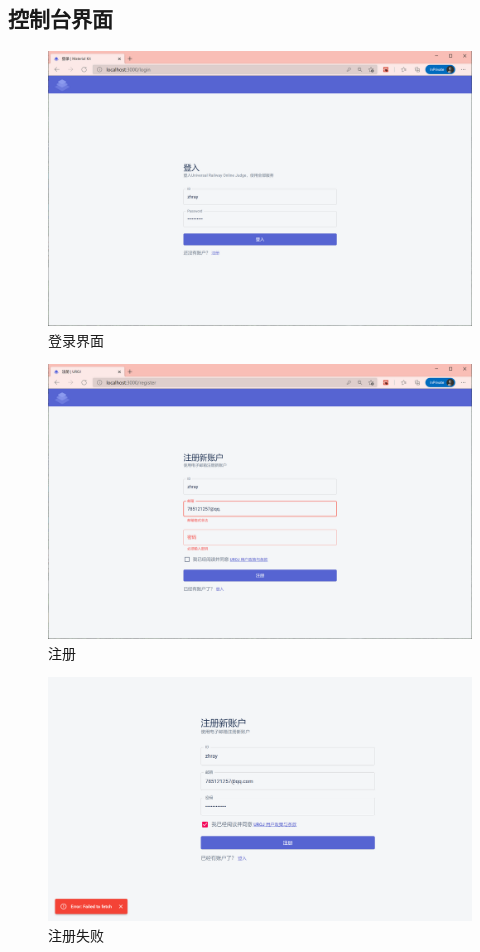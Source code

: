 \subsection{控制台界面}
\begin{figure}[htbp!]
    \centering
    \includegraphics[width=\textwidth]{figures/png/login.png}
    \caption{\label{login}登录界面}
\end{figure}

\begin{figure}[htbp!]
    \centering
    \includegraphics[width=\textwidth]{figures/png/input_err.png}
    \caption{\label{input_err}注册}
\end{figure}

\begin{figure}[htbp!]
    \centering
    \includegraphics[width=\textwidth]{figures/png/alert_err.png}
    \caption{\label{alert_err}注册失败}
\end{figure}

